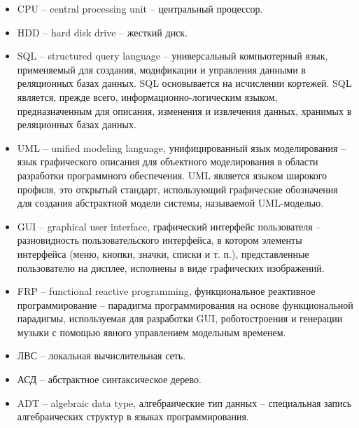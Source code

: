\begin{itemize}
\item CPU -- central processing unit -- центральный процессор.
\item HDD -- hard disk drive -- жесткий диск.
\item SQL -- structured query language -- универсальный компьютерный язык, применяемый для создания, модификации и управления данными в реляционных базах данных. SQL основывается на исчислении кортежей. SQL является, прежде всего, информационно-логическим языком, предназначенным для описания, изменения и извлечения данных, хранимых в реляционных базах данных. 
\item UML -- unified modeling language, унифицированный язык моделирования -- язык графического описания для объектного моделирования в области разработки программного обеспечения. UML является языком широкого профиля, это открытый стандарт, использующий графические обозначения для создания абстрактной модели системы, называемой UML-моделью.
\item GUI -- graphical user interface, графический интерфейс пользователя -- разновидность пользовательского интерфейса, в котором элементы интерфейса (меню, кнопки, значки, списки и т. п.), представленные пользователю на дисплее, исполнены в виде графических изображений.
\item FRP -- functional reactive programming, функциональное реактивное программирование -- парадигма программирования на основе функциональной парадигмы, используемая для разработки GUI, роботостроения и генерации музыки с помощью явного управлением модельным временем.
\item ЛВС -- локальная вычислительная сеть.
\item АСД -- абстрактное синтаксическое дерево.
\item ADT -- algebraic data type, алгебраические тип данных -- специальная запись алгебраических структур в языках программирования.
\end{itemize}